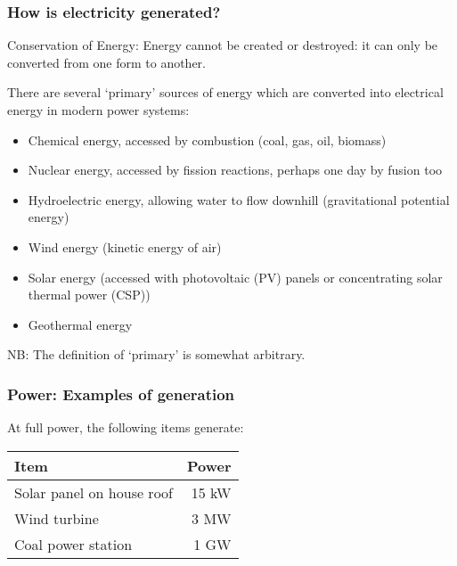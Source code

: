 \documentclass[10pt,aspectratio=169,dvipsnames]{beamer}
\newcommand{\ra}[1]{\renewcommand{\arraystretch}{#1}}
\let\olditem\item
\renewcommand{\item}{%
\olditem\vspace{5pt}}
\begin{document}
\begin{frame}
  \frametitle{How is electricity generated?}

  \alert{Conservation of Energy}: Energy cannot be created or destroyed:
  it can only be converted from one form to another.

  There are several `primary' sources of energy which are converted
  into electrical energy in modern power systems:
  \begin{itemize}
  \item Chemical energy, accessed by combustion (coal, gas, oil, biomass)
  \item Nuclear energy, accessed by fission reactions, perhaps one day by fusion too
  \item Hydroelectric energy, allowing water to flow downhill (gravitational potential energy)
  \item Wind energy (kinetic energy of air)
  \item Solar energy (accessed with photovoltaic (PV) panels or
    concentrating solar thermal power (CSP))
  \item Geothermal energy
  \end{itemize}
  NB: The definition of `primary' is somewhat arbitrary.

\end{frame}



\begin{frame}
  \frametitle{Power: Examples of generation}

  At full power, the following items generate:

  \ra{1.1}
  \begin{table}[!t]
    \begin{tabular}{lr}
      \toprule
      Item & Power\\
      \midrule
      Solar panel on house roof & 15 kW \\
      Wind turbine & 3 MW \\
      Coal power station & 1 GW \\
      \bottomrule
    \end{tabular}
  \end{table}

\end{frame}
\end{document}
